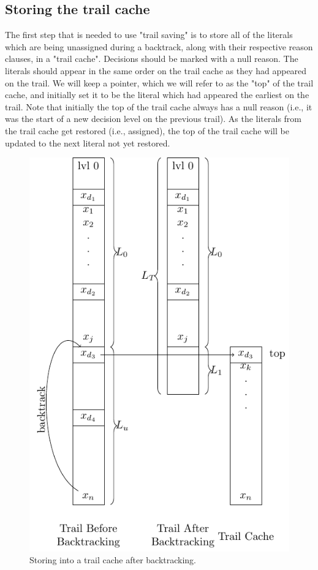 \documentclass{article}
\begin{document}
\subsection{Storing the trail cache}

The first step that is needed to use "trail saving" is to store all of the literals which are being unassigned during a backtrack, along with their respective reason clauses, in a "trail cache". Decisions should be marked with a null reason. The literals should appear in the same order on the trail cache as they had appeared on the trail. We will keep a pointer, which we will refer to as the "top" of the trail cache, and initially set it to be the literal which had appeared the earliest on the trail. Note that initially the top of the trail cache always has a null reason (i.e., it was the start of a new decision level on the previous trail). As the literals from the trail cache get restored (i.e., assigned), the top of the trail cache will be updated to the next literal not yet restored.

\begin{figure}\center\includegraphics[scale=0.7]{trail_diagram.pdf}\caption{Storing into a trail cache after backtracking.}\end{figure}
\end{document}
